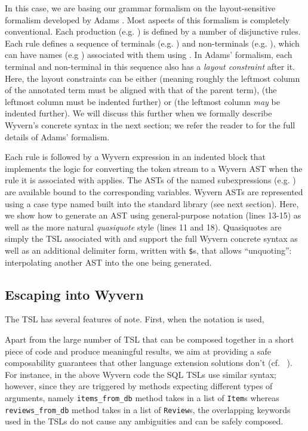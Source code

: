 In this case, we are basing our grammar formalism on the layout-sensitive formalism developed by Adams \cite{adams}. Most aspects of this formalism is completely conventional. 
Each production (e.g. ) is defined by a number of disjunctive rules. Each rule defines a sequence of terminals (e.g. ) and non-terminals (e.g. ), which can have names (e.g ) associated with them using \li{::}. In Adams' formalism, each terminal and non-terminal in this sequence also has a \emph{layout constraint} after it. Here, the layout constraints can be either \li{=} (meaning roughly the leftmost column of the annotated term must be aligned with that of the parent term), \li{>} (the leftmost column must be indented further) or \li{>=} (the leftmost column \emph{may} be indented further). We will discuss this further when we formally describe Wyvern's concrete syntax in the next section; we refer the reader to \cite{adams} for the full details of Adams' formalism.

Each rule is  followed by a Wyvern expression in an indented block that implements the logic for converting the token stream to a Wyvern AST when the rule it is associated with applies. The ASTs of the named subexpressions (e.g. ) are available bound to the corresponding variables. Wyvern ASTs are represented using a case type named  built into the standard library (see next section). Here, we show how to generate an AST using general-purpose notation (lines 13-15) as well as the more natural \emph{quasiquote} style (lines 11 and 18). Quasiquotes are simply the TSL associated with  and support the full Wyvern concrete syntax as well as an additional delimiter form, written with \verb|$|s, that allows ``unquoting'': interpolating another AST into the one being generated.

\subsection{Escaping into Wyvern}
The  TSL has several features of note. First, when the  notation is used, 


Apart from the large number of TSL that can be composed together in a short piece of code and produce meaningful results, we aim at providing a safe composability guarantees that other language extension solutions don't (cf.~\cite{Erdweg:2013:FEL:2517208.2517210} ). For instance, in the above Wyvern code the SQL TSLs use similar syntax; however, since they are triggered by methods expecting different types of arguments, namely \lstinline{items_from_db} method takes in a list of \lstinline{Item}s whereas \lstinline{reviews_from_db} method takes in a list of \lstinline{Review}s, the overlapping keywords used in the TSLs do not cause any ambiguities and can be safely composed.

